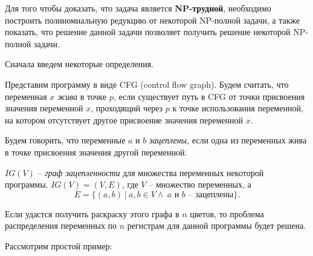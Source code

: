 Для того чтобы доказать, что задача является \textbf{NP-трудной}, необходимо построить полиномиальную редукцию
от некоторой NP-полной задачи, а также показать, что решение данной задачи позволяет получить решение некоторой
NP-полной задачи.

Сначала введем некоторые определения.

\begin{definition}

    \label{def:liveness} %

Представим программу в виде CFG (control flow graph).
    Будем считать, что переменная $x$ \textit{жива} в точке $p$, если существует путь в CFG от точки присвоения значения переменной $x$, проходящий
    через $p$ к точке использования переменной, на котором отсутствует другое присвоение значения переменной $x$.

\end{definition}

\begin{definition}

    Будем говорить, что переменные $a$ и $b$ \textit{зацеплены}, если одна из переменных жива в точке присвоения значения
    другой переменной.

\end{definition}

\begin{definition}

    $IG(V)$ -- \textit{граф зацепленности} для множества переменных некоторой программы.
    $IG(V) = (V, E)$, где $V$ -- множество переменных, а
    $$E = \{(a, b) \ | \  a, b \in V \land \ a \text{ и } b \text{ -- зацеплены}\}.$$

\end{definition}

Если удастся получить раскраску этого графа в $n$ цветов, то проблема распределения переменных по
$n$ регистрам для данной программы будет решена.

Рассмотрим простой пример:

